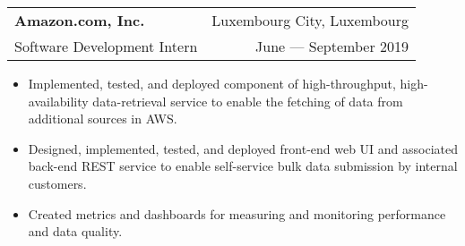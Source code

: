 \documentclass[11pt]{article}
\begin{document}
\begin{tabularx}{\textwidth}{X r}
    \textbf{Amazon.com, Inc.}                       & \small{Luxembourg City, Luxembourg} \\
    Software Development Intern                     & \small{June --- September 2019} \\
\end{tabularx}
\begin{itemize}
    \item Implemented, tested, and deployed component of high-throughput,
        high-availability data-retrieval service to enable the fetching of data from
        additional sources in AWS.\@
    \item Designed, implemented, tested, and deployed front-end web UI and associated
        back-end REST service to enable self-service bulk data submission by internal
        customers.
    \item Created metrics and dashboards for measuring and monitoring performance and data
        quality.
\end{itemize}

\midrule
\end{document}
